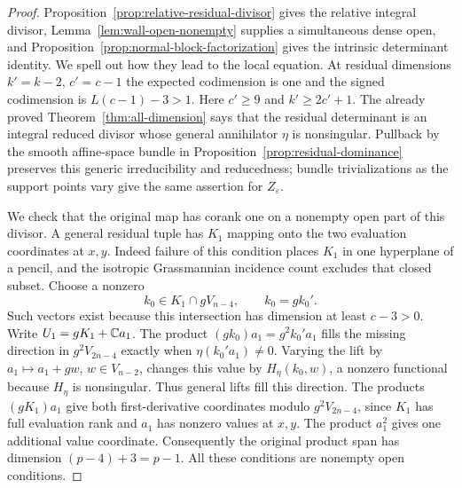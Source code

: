 \begin{proof}
Proposition~\ref{prop:relative-residual-divisor} gives the relative
integral divisor, Lemma~\ref{lem:wall-open-nonempty} supplies a
simultaneous dense open, and Proposition~\ref{prop:normal-block-factorization}
gives the intrinsic determinant identity. We spell out how they lead
to the local equation. At residual dimensions $k'=k-2$, $c'=c-1$ the expected codimension
is one and the signed codimension is $L(c-1)-3>1$.
Here $c'\ge9$ and $k'\ge2c'+1$. The already proved
Theorem~\ref{thm:all-dimension} says that the residual determinant
is an integral reduced divisor whose general annihilator $\eta$ is
nonsingular. Pullback by the smooth affine-space bundle in
Proposition~\ref{prop:residual-dominance} preserves this generic
irreducibility and reducedness; bundle trivializations as the support
points vary give the same assertion for $Z_\varepsilon$.

We check that the original map has corank one on a nonempty open part
of this divisor. A general residual tuple has $K_1$ mapping onto the
two evaluation coordinates at $x,y$. Indeed failure of this condition
places $K_1$ in one hyperplane of a pencil, and the isotropic
Grassmannian incidence count excludes that closed subset. Choose a
nonzero
\[
 k_0\in K_1\cap gV_{n-4},\qquad k_0=gk_0'.
\]
Such vectors exist because this intersection has dimension at least
$c-3>0$. Write $U_1=gK_1+\mathbb C a_1$.
The product $(gk_0)a_1=g^2k_0'a_1$ fills the missing direction in
$g^2V_{2n-4}$ exactly when $\eta(k_0'a_1)\ne0$.
Varying the lift by $a_1\mapsto a_1+gw$, $w\in V_{n-2}$,
changes this value by $H_\eta(k_0,w)$, a nonzero functional because
$H_\eta$ is nonsingular. Thus general lifts fill this direction.
The products $(gK_1)a_1$ give both first-derivative coordinates modulo
$g^2V_{2n-4}$, since $K_1$ has full evaluation rank and $a_1$ has
nonzero values at $x,y$. The product $a_1^2$ gives one additional value
coordinate. Consequently the original product span has dimension
$(p-4)+3=p-1$. All these conditions are nonempty open conditions.


\end{proof}
